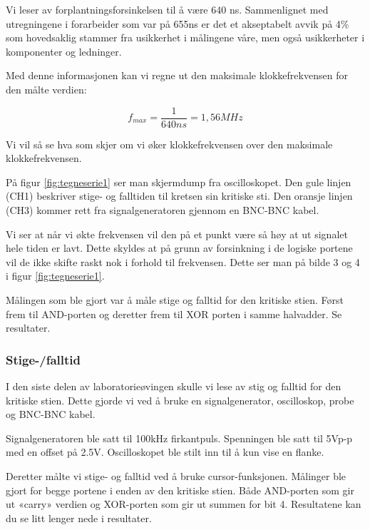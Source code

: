 \documentclass{article}
\begin{document}
Vi leser av forplantningsforsinkelsen til å være 640 ns. Sammenlignet med utregningene i forarbeider som var på 655ns er det et akseptabelt avvik på 4\% som hovedsaklig stammer fra usikkerhet i målingene våre, men også usikkerheter i komponenter og ledninger.

Med denne informasjonen kan vi regne ut den maksimale klokkefrekvensen for den målte verdien:

\begin{equation}
	f_{max} = \frac{1}{640ns} = 1,56 MHz
\end{equation}

Vi vil så se hva som skjer om vi øker klokkefrekvensen over den maksimale klokkefrekvensen.


På figur \ref{fig:tegneserie1} ser man skjermdump fra oscilloskopet. Den gule linjen (CH1) beskriver stige- og falltiden til kretsen sin kritiske sti. Den oransje linjen (CH3) kommer rett fra signalgeneratoren gjennom en BNC-BNC kabel.

Vi ser at når vi økte frekvensen vil den på et punkt være så høy at ut signalet hele tiden er lavt. Dette skyldes at på grunn av forsinkning i de logiske portene vil de ikke skifte raskt nok i forhold til frekvensen. Dette ser man på bilde 3 og 4 i figur \ref{fig:tegneserie1}.

Målingen som ble gjort var å måle stige og falltid for den kritiske stien. Først frem til AND-porten og deretter frem til XOR porten i samme halvadder. Se resultater.


\subsubsection{Stige-/falltid}
I den siste delen av laboratorieøvingen skulle vi lese av stig og falltid for den kritiske stien. Dette gjorde vi ved å bruke en signalgenerator, oscilloskop, probe og BNC-BNC kabel.

Signalgeneratoren ble satt til 100kHz firkantpuls. Spenningen ble satt til 5Vp-p med en offset på 2.5V.  Oscilloskopet ble stilt inn til å kun vise en flanke.

Deretter målte vi stige- og falltid ved å bruke cursor-funksjonen. Målinger ble gjort for begge portene i enden av den kritiske stien. Både AND-porten som gir ut «carry» verdien og XOR-porten som gir ut summen for bit 4. Resultatene kan du se litt lenger nede i resultater.
\end{document}
